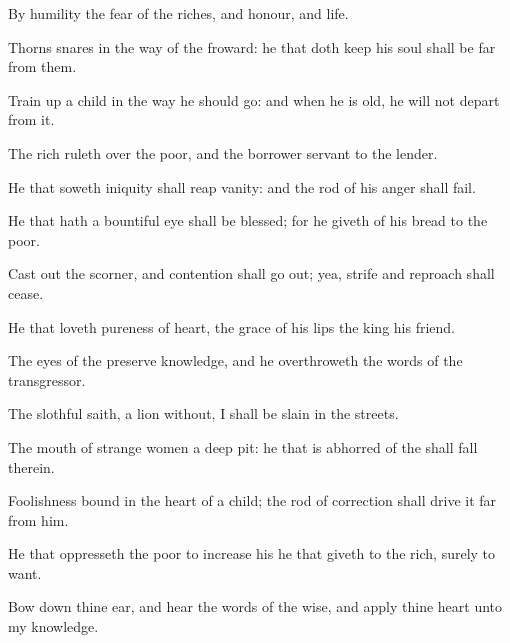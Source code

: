 {By
humility
{} the
fear of the
{}
{}
riches, and
honour, and
life.

Thorns
{}
snares
{} in the
way of the
froward: he that doth
keep his
soul shall be
far from them.

Train
up a
child in the
way he should
go: and when he is
old, he will not
depart from it.

The
rich
ruleth over the
poor, and the
borrower
{}
servant to the
lender.

He that
soweth
iniquity shall
reap
vanity: and the
rod of his
anger shall
fail.

He that hath a
bountiful
eye shall be
blessed; for he
giveth of his
bread to the
poor.

Cast
out the
scorner, and
contention shall go
out; yea,
strife and
reproach shall
cease.

He that
loveth
pureness of
heart,
{} the
grace of his
lips the
king
{} his
friend.

The
eyes of the
{}
preserve
knowledge, and he
overthroweth the
words of the
transgressor.

The
slothful
{}
saith,
{} a
lion
without, I shall be
slain
in the
streets.

The
mouth of strange
women
{} a
deep
pit: he that is
abhorred of the
{} shall
fall therein.

Foolishness
{}
bound in the
heart of a
child;
{} the
rod of
correction shall drive it
far from him.

He that
oppresseth the
poor to
increase his
{} he that
giveth to the
rich,
{} surely
{} to
want.


\par }{\PP {}Bow
down thine
ear, and
hear the
words of the
wise, and
apply thine
heart unto my
knowledge.

}
